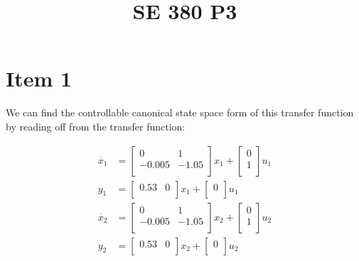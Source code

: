 \documentclass[conference]{IEEEtran}
\begin{document}
\title{SE 380 P3}

\author{
\and
{}
}

\maketitle

\section{Item 1}

We can find the controllable canonical state space form of this transfer function by reading off from the transfer function:

\begin{align*}
    \dot{x_1} &= \begin{bmatrix}
        0 & 1 \\
        -0.005 & -1.05 \\
    \end{bmatrix}
    x_1 +
    \begin{bmatrix}
        0 \\
        1 \\
    \end{bmatrix}
    u_1 \\
    y_1 &= \begin{bmatrix}
        0.53 & 0 \\
    \end{bmatrix}
    x_1 +
    \begin{bmatrix}
        0 \\
    \end{bmatrix}
    u_1 \\
    \dot{x_2} &= \begin{bmatrix}
        0 & 1 \\
        -0.005 & -1.05 \\
    \end{bmatrix}
    x_2 +
    \begin{bmatrix}
        0 \\
        1 \\
    \end{bmatrix}
    u_2 \\
    y_2 &= \begin{bmatrix}
        0.53 & 0 \\
    \end{bmatrix}
    x_2 +
    \begin{bmatrix}
        0 \\
    \end{bmatrix}
    u_2 \\
\end{align*}
\end{document}
